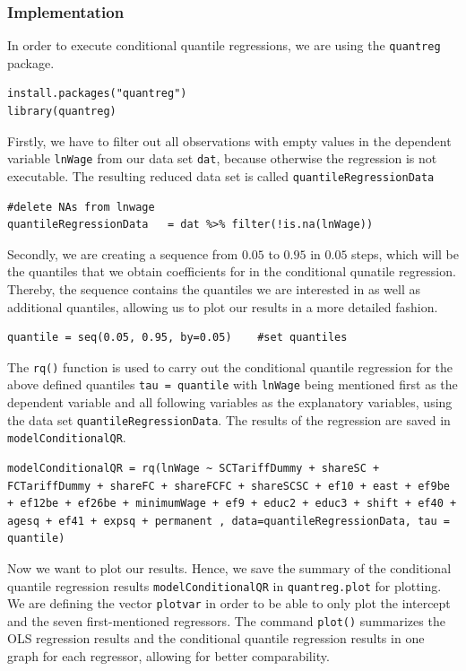 \subsubsection*{Implementation}
In order to execute conditional quantile regressions, we are using the \texttt{quantreg}  package.
\lstset{firstnumber = 439}
\begin{lstlisting}
install.packages("quantreg")
library(quantreg)
\end{lstlisting}
Firstly, we have to filter out all observations with empty values in the dependent variable \texttt{lnWage} from our data set \texttt{dat}, because otherwise the regression is not executable. The resulting reduced data set is called \texttt{quantileRegressionData}
\lstset{firstnumber = 445}
\begin{lstlisting}
#delete NAs from lnwage
quantileRegressionData   = dat %>% filter(!is.na(lnWage))
\end{lstlisting}
Secondly, we are creating a sequence from $0.05$ to $0.95$ in $0.05$ steps, which will be the quantiles that we obtain coefficients for in the conditional qunatile regression. Thereby, the sequence contains the quantiles we are interested in as well as additional quantiles, allowing us to plot our results in a more detailed fashion.
\lstset{firstnumber = 449}
\begin{lstlisting}
quantile = seq(0.05, 0.95, by=0.05)    #set quantiles
\end{lstlisting}
 The \texttt{rq()} function is used to carry out the conditional quantile regression for the above defined quantiles \texttt{tau = quantile} with \texttt{lnWage} being mentioned first as the dependent variable and all following variables as the explanatory variables, using the data set \texttt{quantileRegressionData}. The results of the regression are saved in \texttt{modelConditionalQR}.
\lstset{firstnumber = 452}
\begin{lstlisting}
modelConditionalQR = rq(lnWage ~ SCTariffDummy + shareSC + FCTariffDummy + shareFC + shareFCFC + shareSCSC + ef10 + east + ef9be + ef12be + ef26be + minimumWage + ef9 + educ2 + educ3 + shift + ef40 + agesq + ef41 + expsq + permanent , data=quantileRegressionData, tau = quantile)
\end{lstlisting}
Now we want to plot our results. Hence, we save the summary of the conditional quantile regression results \texttt{modelConditionalQR} in \texttt{quantreg.plot} for plotting. We are defining the vector \texttt{plotvar} in order to be able to only plot the intercept and the seven first-mentioned regressors. The command \texttt{plot()} summarizes the OLS regression results and the conditional quantile regression results in one graph for each regressor, allowing for better comparability.
